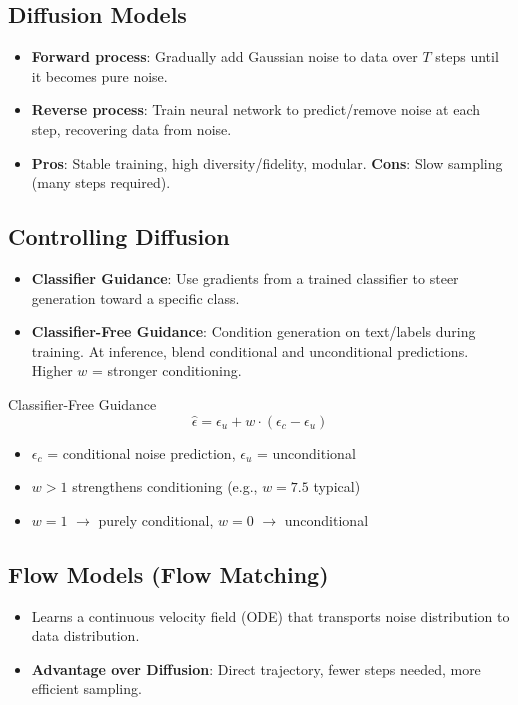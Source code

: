 \documentclass[11pt]{article}
\begin{document}
\subsection{Diffusion Models}
\begin{itemize}
    \item \textbf{Forward process}: Gradually add Gaussian noise to data over $T$ steps until it becomes pure noise.
    \item \textbf{Reverse process}: Train neural network to predict/remove noise at each step, recovering data from noise.
    \item \textbf{Pros}: Stable training, high diversity/fidelity, modular. \textbf{Cons}: Slow sampling (many steps required).
\end{itemize}

\subsection{Controlling Diffusion}
\begin{itemize}
    \item \textbf{Classifier Guidance}: Use gradients from a trained classifier to steer generation toward a specific class.
    \item \textbf{Classifier-Free Guidance}: Condition generation on text/labels during training. At inference, blend conditional and unconditional predictions. Higher $w$ = stronger conditioning.
\end{itemize}

\begin{formulabox}{Classifier-Free Guidance}
$$\hat{\epsilon} = \epsilon_u + w \cdot (\epsilon_c - \epsilon_u)$$
\begin{itemize}
    \item $\epsilon_c$ = conditional noise prediction, $\epsilon_u$ = unconditional
    \item $w > 1$ strengthens conditioning (e.g., $w = 7.5$ typical)
    \item $w = 1$ $\rightarrow$ purely conditional, $w = 0$ $\rightarrow$ unconditional
\end{itemize}
\end{formulabox}

\subsection{Flow Models (Flow Matching)}
\begin{itemize}
    \item Learns a continuous velocity field (ODE) that transports noise distribution to data distribution.
    \item \textbf{Advantage over Diffusion}: Direct trajectory, fewer steps needed, more efficient sampling.
\end{itemize}
\end{document}
